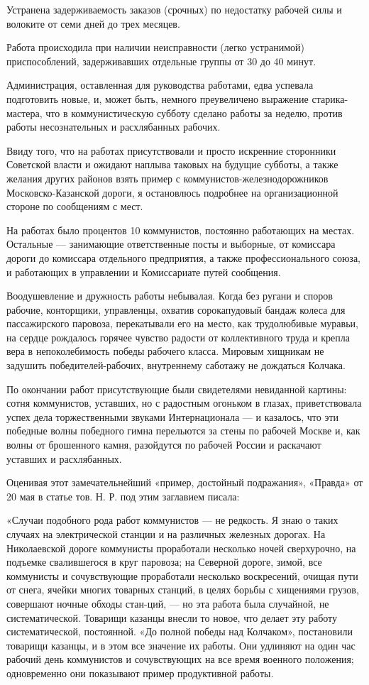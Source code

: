 \documentclass[12pt]{article}
\newcommand{\parnum}{(\arabic{parcount})}
\newcounter{parcount}
\newenvironment{parnumbers}{%
  \par%
  \everypar{\noindent \stepcounter{parcount}\marginpar[]{\parnum}}%
}{}
\begin{document}
\begin{parnumbers}
Устранена задерживаемость заказов (срочных) по недостатку рабочей силы и волоките от семи дней до трех месяцев.

Работа происходила при наличии неисправности (легко устранимой) приспособлений, задерживавших отдельные группы от 30 до 40 минут.

Администрация, оставленная для руководства работами, едва успевала подготовить новые, и, может быть, немного преувеличено выражение старика-мастера, что в коммунистическую субботу сделано работы за неделю, против работы несознательных и расхлябанных рабочих.

Ввиду того, что на работах присутствовали и просто искренние сторонники Советской власти и ожидают наплыва таковых на будущие субботы, а также желания других районов взять пример с коммунистов-железнодорожников Московско-Казанской дороги, я остановлюсь подробнее на организационной стороне по сообщениям с мест.

На работах было процентов 10 коммунистов, постоянно работающих на местах. Остальные — занимающие ответственные посты и выборные, от комиссара дороги до комиссара отдельного предприятия, а также профессионального союза, и работающих в управлении и Комиссариате путей сообщения.

Воодушевление и дружность работы небывалая. Когда без ругани и споров рабочие, конторщики, управленцы, охватив сорокапудовый бандаж колеса для пассажирского паровоза, перекатывали его на место, как трудолюбивые муравьи, на сердце рождалось горячее чувство радости от коллективного труда и крепла вера в непоколебимость победы рабочего класса. Мировым хищникам не задушить победителей-рабочих, внутреннему саботажу не дождаться Колчака.

По окончании работ присутствующие были свидетелями невиданной картины: сотня коммунистов, уставших, но с радостным огоньком в глазах, приветствовала успех дела торжественными звуками Интернационала — и казалось, что эти победные волны победного гимна перельются за стены по рабочей Москве и, как волны от брошенного камня, разойдутся по рабочей России и раскачают уставших и расхлябанных.

Оценивая этот замечательнейший «пример, достойный подражания», «Правда» от 20 мая в статье тов. Н. Р. под этим заглавием писала:

«Случаи подобного рода работ коммунистов — не редкость. Я знаю о таких случаях на электрической станции и на различных железных дорогах. На Николаевской дороге коммунисты проработали несколько ночей сверхурочно, на подъемке свалившегося в круг паровоза; на Северной дороге, зимой, все коммунисты и сочувствующие проработали несколько воскресений, очищая пути от снега, ячейки многих товарных станций, в целях борьбы с хищениями грузов, совершают ночные обходы стан-ций, — но эта работа была случайной, не систематической. Товарищи казанцы внесли то новое, что делает эту работу систематической, постоянной. «До полной победы над Колчаком», постановили товарищи казанцы, и в этом все значение их работы. Они удлиняют на один час рабочий день коммунистов и сочувствующих на все время военного положения; одновременно они показывают пример продуктивной работы.


\end{parnumbers}
\end{document}
